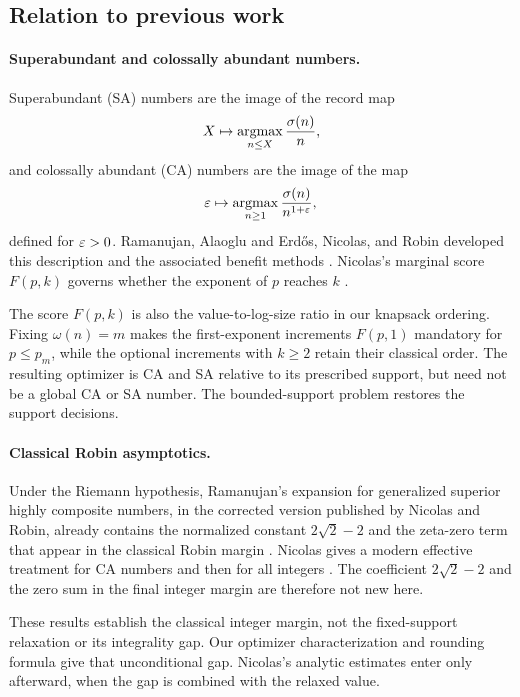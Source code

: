 \subsection{Relation to previous work}
\label{s-related-work}

\paragraph{Superabundant and colossally abundant numbers.}
Superabundant (SA) numbers are the image of the record map
\[
    X\mapsto\operatorname*{argmax}_{n\leq X}\frac{\sigma(n)}n,
\]
and colossally abundant (CA) numbers are the image of the map
\[
    \varepsilon\mapsto\operatorname*{argmax}_{n\geq1}\frac{\sigma(n)}{n^{1+\varepsilon}},
\]
defined for \(\varepsilon>0\).
Ramanujan, Alaoglu and Erd\H{o}s, Nicolas, and Robin developed this
description and the associated benefit methods
\cite{ramanujan-hcn-1997,alaoglu1944,nicolas-1975-asterisque,
nicolas-1976-asterisque,robin-1980,robin-1983-rairo}.
Nicolas's marginal score \(F(p,k)\) governs whether the exponent of \(p\)
reaches \(k\) \cite[Section~4.1]{nicolas-2022-sigma}.

The score \(F(p,k)\) is also the value-to-log-size ratio in our knapsack
ordering. Fixing \(\omega(n)=m\) makes the first-exponent increments
\(F(p,1)\) mandatory for \(p\leq p_m\), while the optional increments
with \(k\geq2\) retain their classical order. The resulting optimizer is
CA and SA relative to its prescribed support, but need not be a global
CA or SA number. The bounded-support problem restores the support
decisions.

\paragraph{Classical Robin asymptotics.}
Under the Riemann hypothesis, Ramanujan's expansion for generalized
superior highly composite numbers, in the corrected version published by
Nicolas and Robin, already contains the normalized constant
\(2\sqrt2-2\) and the zeta-zero term that appear in the classical Robin
margin
\cite[formula~(382) and Note~71]{ramanujan-hcn-1997}. Nicolas gives a
modern effective treatment for CA numbers and then for all integers
\cite[Proposition~5.1 and Theorem~1.1]{nicolas-2022-sigma}. The
coefficient \(2\sqrt2-2\) and the zero sum in the final integer margin are
therefore not new here.

These results establish the classical integer margin, not the
fixed-support relaxation or its integrality gap. Our optimizer
characterization and rounding formula give that unconditional
gap. Nicolas's analytic estimates enter only afterward, when the gap is
combined with the relaxed value.

